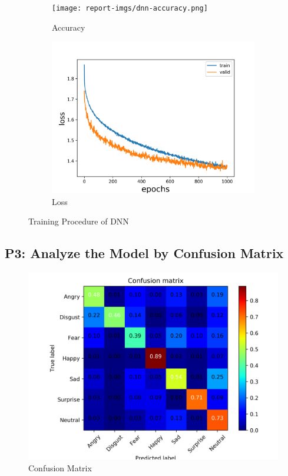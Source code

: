 \documentclass[fleqn,a4paper,12pt]{article}
\begin{document}
\begin{figure}[H]
\centering
\begin{subfigure}{.5\textwidth}
  \centering
  \texttt{[image: report-imgs/dnn-accuracy.png]}
  \caption{Accuracy}
  \label{fig:sub1}
\end{subfigure}%
\begin{subfigure}{.5\textwidth}
  \centering
  \includegraphics[width=\linewidth]{report-imgs/dnn-loss.png}
  \caption{Loss}
  \label{fig:sub2}
\end{subfigure}
\caption{Training Procedure of DNN}
\label{fig:test}
\end{figure}


\subsection*{P3: Analyze the Model by Confusion Matrix}

\begin{figure}[H]
\centering
\includegraphics[width=\linewidth]{report-imgs/confusion.png}
\caption{Confusion Matrix}
\label{fig:confusion}
\end{figure}
\end{document}
